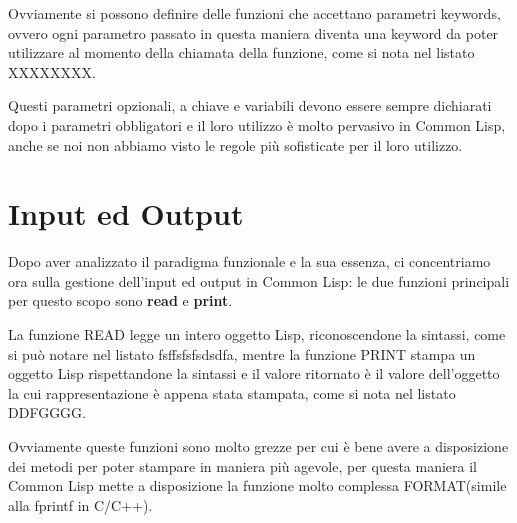 \documentclass[a4paper]{book}
\begin{document}
Ovviamente si possono definire delle funzioni che accettano parametri keywords, ovvero
ogni parametro passato in questa maniera diventa una keyword da poter utilizzare
al momento della chiamata della funzione, come si nota nel listato XXXXXXXX.

Questi parametri opzionali, a chiave e variabili devono essere sempre dichiarati
dopo i parametri obbligatori e il loro utilizzo è molto pervasivo in Common Lisp,
anche se noi non abbiamo visto le regole più sofisticate per il loro utilizzo.


\section{Input ed Output}
Dopo aver analizzato il paradigma funzionale e la sua essenza, ci concentriamo ora
sulla gestione dell'input ed output in Common Lisp: le due funzioni principali per
questo scopo sono \textbf{read} e \textbf{print}.

La funzione READ legge un intero oggetto Lisp, riconoscendone la sintassi, come
si può notare nel listato fsffsfsfsdsdfa, mentre la funzione PRINT stampa un oggetto
Lisp rispettandone la sintassi e il valore ritornato è il valore dell'oggetto la
cui rappresentazione è appena stata stampata, come si nota nel listato DDFGGGG.

Ovviamente queste funzioni sono molto grezze per cui è bene avere a disposizione
dei metodi per poter stampare in maniera più agevole, per questa maniera il Common Lisp
mette a disposizione la funzione molto complessa FORMAT(simile alla fprintf in C/C++).
\end{document}
